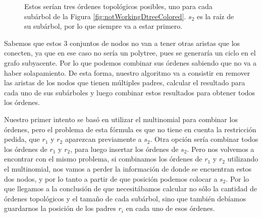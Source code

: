  \begin{figure}[ht]
    \centering
    \caption{Estos serían tres órdenes topológicos posibles, uno para cada subárbol de la Figura \ref{fig:notWorkingDtreeColored}. $s_2$ es la raíz de su subárbol, por lo que siempre va a estar primero.}
    \label{fig:multiples_toposorts_polytree}
\end{figure}


Sabemos que estos 3 conjuntos de nodos no van a tener otras aristas que los conecten, ya que en ese caso no sería un polytree, pues se generaría un ciclo en el grafo subyacente. Por lo que podemos combinar sus órdenes sabiendo que no va a haber solapamiento. De esta forma, nuestro algoritmo va a consistir en remover las aristas de los nodos que tienen múltiples padres, calcular el resultado para cada uno de sus subárboles y luego combinar estos resultados para obtener todos los órdenes. 

Nuestro primer intento se basó en utilizar el multinomial para combinar los órdenes, pero el problema de esta fórmula es que no tiene en cuenta la restricción pedida, que $r_1$ y $r_2$ aparezcan previamente a $s_2$. Otra opción sería combinar todos los órdenes de $r_1$ y $r_2$, para luego insertar los órdenes de $s_2$. Pero nos volvemos a encontrar con el mismo problema, si combinamos los órdenes de $r_1$ y $r_2$ utilizando el multinomial, nos vamos a perder la información de donde se encuentran estos dos nodos, y por lo tanto a partir de que posición podemos colocar a $s_2$. Por lo que llegamos a la conclusión de que necesitábamos calcular no sólo la cantidad de órdenes topológicos y el tamaño de cada subárbol, sino que también debíamos guardarnos la posición de los padres $r_i$ en cada uno de esos órdenes. 

